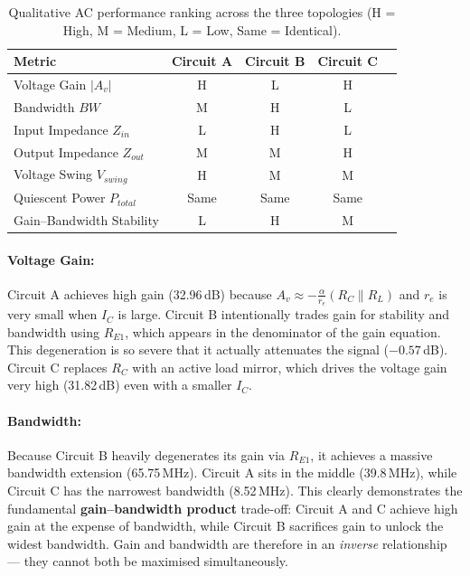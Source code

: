\documentclass[11pt, a4paper]{article}
\begin{document}
\begin{table}[H]
    \centering
    \caption{Qualitative AC performance ranking across the three topologies (H = High, M = Medium, L = Low, Same = Identical).}
    \renewcommand{\arraystretch}{1.3}
    \begin{tabular}{lcccc}
        \toprule
        \textbf{Metric} & \textbf{Circuit A} & \textbf{Circuit B} & \textbf{Circuit C} \\
        \midrule
        Voltage Gain $|A_v|$ & H & L & H \\
        Bandwidth $BW$       & M & H & L \\
        Input Impedance $Z_{in}$ & L & H & L \\
        Output Impedance $Z_{out}$ & M & M & H \\
        Voltage Swing $V_{swing}$ & H & M & M \\
        Quiescent Power $P_{total}$ & Same & Same & Same \\
        Gain--Bandwidth Stability & L & H & M \\
        \bottomrule
    \end{tabular}
    \label{tab:ac_comparison}
\end{table}

\paragraph{Voltage Gain:}
Circuit A achieves high gain (32.96\,dB) because $A_v \approx -\frac{\alpha}{r_e}(R_C \| R_L)$ and $r_e$ is very small when $I_C$ is large.
Circuit B intentionally trades gain for stability and bandwidth using $R_{E1}$, which appears in the denominator of the gain equation. This degeneration is so severe that it actually attenuates the signal ($-0.57$\,dB). Circuit C replaces $R_C$ with an active load mirror, which drives the voltage gain very high (31.82\,dB) even with a smaller $I_C$.

\paragraph{Bandwidth:}
Because Circuit B heavily degenerates its gain via $R_{E1}$, it achieves a massive bandwidth extension (65.75\,MHz). Circuit A sits in the middle (39.8\,MHz), while Circuit C has the narrowest bandwidth (8.52\,MHz). This clearly demonstrates the fundamental \textbf{gain--bandwidth product} trade-off: Circuit A and C achieve high gain at the expense of bandwidth, while Circuit B sacrifices gain to unlock the widest bandwidth. Gain and bandwidth are therefore in an \textit{inverse} relationship --- they cannot both be maximised simultaneously.
\end{document}
